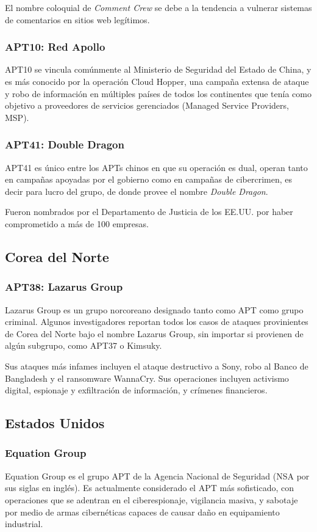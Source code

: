 \documentclass{article}
\begin{document}
El nombre coloquial de {\it Comment Crew} se debe a la tendencia a vulnerar sistemas de comentarios en sitios web legítimos.

\subsubsection{APT10: Red Apollo}
APT10 se vincula comúnmente al Ministerio de Seguridad del Estado de China, y es más conocido por la operación Cloud Hopper, una campaña extensa de ataque y robo de información en múltiples países de todos los continentes que tenía como objetivo a proveedores de servicios gerenciados (Managed Service Providers, MSP).

\subsubsection{APT41: Double Dragon}
APT41 es único entre los APTs chinos en que su operación es dual, operan tanto en campañas apoyadas por el gobierno como en campañas de cibercrimen, es decir para lucro del grupo, de donde provee el nombre {\it Double Dragon}.

Fueron nombrados por el Departamento de Justicia de los EE.UU. por haber comprometido a más de 100 empresas.

\subsection{Corea del Norte}
\subsubsection{APT38: Lazarus Group}
Lazarus Group es un grupo norcoreano designado tanto como APT como grupo criminal. Algunos investigadores reportan todos los casos de ataques provinientes de Corea del Norte bajo el nombre Lazarus Group, sin importar si provienen de algún subgrupo, como APT37 o Kimsuky.

Sus ataques más infames incluyen el ataque destructivo a Sony, robo al Banco de Bangladesh y el ransomware WannaCry. Sus operaciones incluyen activismo digital, espionaje y exfiltración de información, y crímenes financieros.

\subsection{Estados Unidos}
\subsubsection{Equation Group}
Equation Group es el grupo APT de la Agencia Nacional de Seguridad (NSA por sus siglas en inglés). Es actualmente considerado el APT más sofisticado, con operaciones que se adentran en el ciberespionaje, vigilancia masiva, y sabotaje por medio de armas cibernéticas capaces de causar daño en equipamiento industrial.
\end{document}
